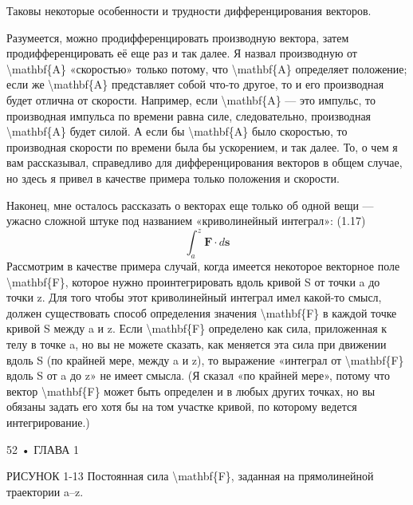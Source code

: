 \documentclass[10pt,oneside]{article}
\newcommand{\TipsSubsection}[1]{\par\vspace{6bp}{\normalsize\bfseries #1\par}\vspace{2bp}}
\begin{document}
Таковы некоторые особенности и трудности дифференцирования векторов.\par

Разумеется, можно продифференцировать производную вектора, затем продифференцировать её еще раз и так далее. Я назвал производную от \textbackslash{}mathbf\{A\} «скоростью» только потому, что \textbackslash{}mathbf\{A\} определяет положение; если же \textbackslash{}mathbf\{A\} представляет собой что-то другое, то и его производная будет отлична от скорости. Например, если \textbackslash{}mathbf\{A\} --- это импульс, то производная импульса по времени равна силе, следовательно, производная \textbackslash{}mathbf\{A\} будет силой. А если бы \textbackslash{}mathbf\{A\} было скоростью, то производная скорости по времени была бы ускорением, и так далее. То, о чем я вам рассказывал, справедливо для дифференцирования векторов в общем случае, но здесь я привел в качестве примера только положения и скорости.\par

\TipsSubsection{1-8 Криволинейные интегралы}

Наконец, мне осталось рассказать о векторах еще только об одной вещи --- ужасно сложной штуке под названием «криволинейный интеграл»: (1.17) \[\int_a^z \mathbf{F} \cdot d\mathbf{s}\] Рассмотрим в качестве примера случай, когда имеется некоторое векторное поле \textbackslash{}mathbf\{F\}, которое нужно проинтегрировать вдоль кривой S от точки a до точки z. Для того чтобы этот криволинейный интеграл имел какой-то смысл, должен существовать способ определения значения \textbackslash{}mathbf\{F\} в каждой точке кривой S между a и z. Если \textbackslash{}mathbf\{F\} определено как сила, приложенная к телу в точке a, но вы не можете сказать, как меняется эта сила при движении вдоль S (по крайней мере, между a и z), то выражение «интеграл от \textbackslash{}mathbf\{F\} вдоль S от a до z» не имеет смысла. (Я сказал «по крайней мере», потому что вектор \textbackslash{}mathbf\{F\} может быть определен и в любых других точках, но вы обязаны задать его хотя бы на том участке кривой, по которому ведется интегрирование.)\par

52 • ГЛАВА 1\par

РИСУНОК 1-13 Постоянная сила \textbackslash{}mathbf\{F\}, заданная на прямолинейной траектории a–z.\par
\end{document}
